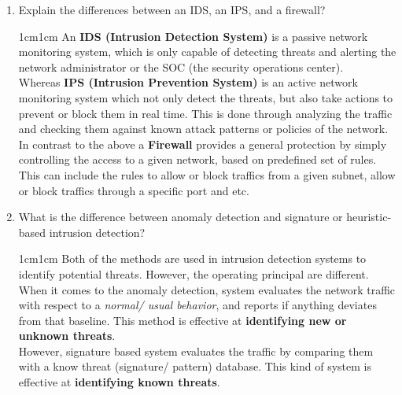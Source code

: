 \documentclass[11pt,letterpaper]{article}
\newenvironment{answer}{\em \color{blue} \begin{adjustwidth}{1cm}{1cm}}{\end{adjustwidth}}
\begin{document}
\begin{enumerate}
\begin{table}[htbp]
\begin{tabularx}{0.8\columnwidth}{|X|X|}
			\end{tabularx}
		\end{table}
		\pagebreak
		\item Explain the differences between an IDS, an IPS, and a firewall?
		
		\begin{answer}
			 An \textbf{IDS (Intrusion Detection System)}  is a passive network monitoring system, which is only capable of detecting threats and alerting the network administrator or the SOC (the security operations center).\\
			 
			 Whereas \textbf{IPS (Intrusion Prevention System)} is an active network monitoring system which not only detect the threats, but also take actions to prevent or block them in real time. This is done through analyzing the traffic and checking them against known attack patterns or policies of the network.\\
			 
			 In contrast to the above a \textbf{Firewall} provides a general protection by simply controlling the access to a given network, based on predefined set of rules. This can include the rules to allow or block traffics from a given subnet, allow or block traffics through a specific port and etc.
		\end{answer}
		
		\item What is the difference between anomaly detection and signature or heuristic-based intrusion detection?
		
		\begin{answer}
			Both of the methods are used in intrusion detection systems to identify potential threats. However, the operating principal are different.\\
			
			When it comes to the anomaly detection, system evaluates the network traffic with respect to a \textit{normal/ usual behavior}, and reports if anything deviates from that baseline. This method is effective at \textbf{identifying new or unknown threats}.\\ 
			
			However, signature based system evaluates the traffic by comparing them with a know threat (signature/ pattern) database. This kind of system is effective at \textbf{identifying known threats}.
		\end{answer}
		
	\end{enumerate}
	
\end{document}
